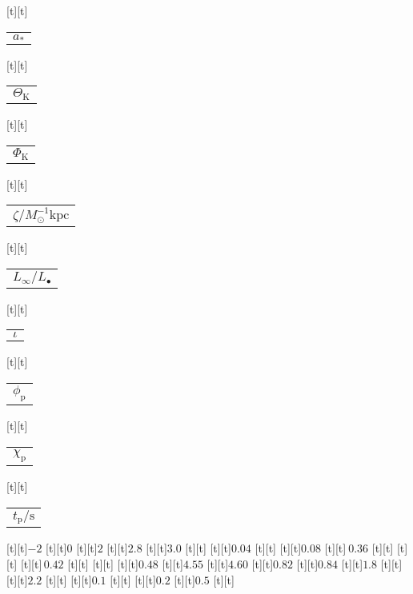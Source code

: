\begin{psfrags}
[t][t]{\color[rgb]{0,0,0}\setlength{\tabcolsep}{0pt}\begin{tabular}{c}{$a_\ast$}\end{tabular}}%
[t][t]{\color[rgb]{0,0,0}\setlength{\tabcolsep}{0pt}\begin{tabular}{c}{$\Theta_\mathrm{K}$}\end{tabular}}%
[t][t]{\color[rgb]{0,0,0}\setlength{\tabcolsep}{0pt}\begin{tabular}{c}{$\Phi_\mathrm{K}$}\end{tabular}}%
[t][t]{\color[rgb]{0,0,0}\setlength{\tabcolsep}{0pt}\begin{tabular}{c}{$\zeta/M_\odot^{-1} \mathrm{kpc}$}\end{tabular}}%
[t][t]{\color[rgb]{0,0,0}\setlength{\tabcolsep}{0pt}\begin{tabular}{c}{$L_\infty/L_\bullet$}\end{tabular}}%
[t][t]{\color[rgb]{0,0,0}\setlength{\tabcolsep}{0pt}\begin{tabular}{c}{$\iota$}\end{tabular}}%
[t][t]{\color[rgb]{0,0,0}\setlength{\tabcolsep}{0pt}\begin{tabular}{c}{$\phi_\mathrm{p}$}\end{tabular}}%
[t][t]{\color[rgb]{0,0,0}\setlength{\tabcolsep}{0pt}\begin{tabular}{c}{$\chi_\mathrm{p}$}\end{tabular}}%
[t][t]{\color[rgb]{0,0,0}\setlength{\tabcolsep}{0pt}\begin{tabular}{c}{$t_\mathrm{p}/\mathrm{s}$}\end{tabular}}%
%
[t][t]{$-2$}%
[t][t]{$0$}%
[t][t]{$2$}%
[t][t]{$2.8$}%
[t][t]{$3.0$}%
[t][t]{}%
[t][t]{$0.04$}%
[t][t]{}%
[t][t]{$0.08$}%
[t][t]{$\ 0.36$}%
[t][t]{}%
[t][t]{}%
[t][t]{$\,0.42$}%
[t][t]{}%
[t][t]{}%
[t][t]{$0.48$}%
[t][t]{$4.55$}%
[t][t]{$4.60$}%
[t][t]{$0.82$}%
[t][t]{$0.84$}%
[t][t]{$1.8$}%
[t][t]{}%
[t][t]{$2.2$}%
[t][t]{}%
[t][t]{$0.1$}%
[t][t]{}%
[t][t]{$0.2$}%
[t][t]{$0.5$}%
[t][t]{}%

\end{psfrags}
